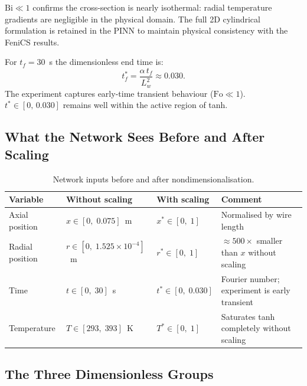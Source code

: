 \documentclass[12pt, a4paper]{article}
\begin{document}
$\mathrm{Bi}\ll 1$ confirms the cross-section is nearly isothermal: radial
temperature gradients are negligible in the physical domain. The full 2D
cylindrical formulation is retained in the PINN to maintain physical consistency
with the FeniCS results.

For $t_f = 30$~s the dimensionless end time is:
\begin{equation}
    t^*_f = \frac{\alpha\, t_f}{L_w^2} \approx 0.030.
    \label{eq:tstar_end}
\end{equation}
The experiment captures early-time transient behaviour ($\mathrm{Fo}\ll 1$).
$t^* \in [0,\,0.030]$ remains well within the active region of tanh.

\subsection{What the Network Sees Before and After Scaling}
\label{sec:nondim_scaling}

\begin{table}[H]
\centering
\caption{Network inputs before and after nondimensionalisation.}
\label{tab:scaling_comparison}
\begin{tabularx}{\textwidth}{l l l X}
\toprule
\textbf{Variable} & \textbf{Without scaling} & \textbf{With scaling} &
\textbf{Comment} \\
\midrule
Axial position
    & $x \in [0,\;0.075]$~m
    & $x^* \in [0,\;1]$
    & Normalised by wire length \\
Radial position
    & $r \in [0,\;1.525\times10^{-4}]$~m
    & $r^* \in [0,\;1]$
    & $\approx\!500\times$ smaller than $x$ without scaling \\
Time
    & $t \in [0,\;30]$~s
    & $t^* \in [0,\;0.030]$
    & Fourier number; experiment is early transient \\
Temperature
    & $T \in [293,\;393]$~K
    & $T^* \in [0,\;1]$
    & Saturates tanh completely without scaling \\
\bottomrule
\end{tabularx}
\end{table}


\subsection{The Three Dimensionless Groups}
\label{sec:nondim_groups}
\end{document}
